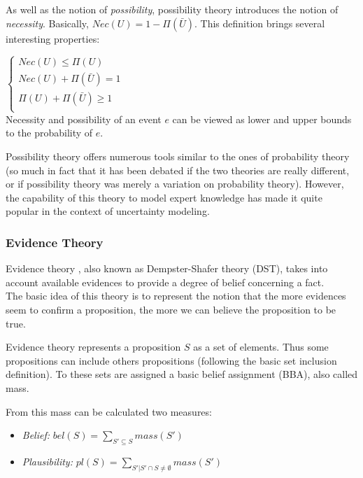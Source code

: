 As well as the notion of \emph{possibility}, possibility theory introduces the notion of \emph{necessity}. Basically, $Nec(U) = 1 - \Pi(\bar{U})$.
This definition brings several interesting properties:

$\left\{
\begin{array}{l}
Nec(U) \leq \Pi(U)\\
Nec(U) + \Pi(\bar{U}) = 1\\
\Pi(U) + \Pi(\bar{U}) \geq 1\\
\end{array}
\right.$
\\

Necessity and possibility of an event $e$ can be viewed as lower and upper bounds to the probability of $e$.

Possibility theory offers numerous tools similar to the ones of probability theory (so much in fact that it has been debated if the two theories are really different, or if possibility theory was merely a variation on probability theory). However, the capability of this theory to model expert knowledge has made it quite popular in the context of uncertainty modeling.

\subsubsection{Evidence Theory}

Evidence theory \cite{shafer1976mathematical}, also known as Dempster-Shafer theory (DST), takes into account available evidences to provide a degree of belief concerning a fact.\\
The basic idea of this theory is to represent the notion that the more evidences seem to confirm a proposition, the more we can believe the proposition to be true.

Evidence theory represents a proposition $S$ as a set of elements. Thus some propositions can include others propositions (following the basic set inclusion definition). To these sets are assigned a basic belief assignment (BBA), also called mass.

From this mass can be calculated two measures:

\begin{itemize}
\item \emph{Belief:} $bel(S) = \displaystyle\sum_{S'\subseteq{S}} mass(S')$
\item \emph{Plausibility:} $pl(S) = \displaystyle\sum_{S'|S' \cap S \neq \emptyset} mass(S')$
\end{itemize}

